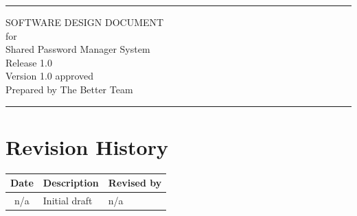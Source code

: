 \documentclass[letterpaper,12pt,oneside,listof=totoc]{scrreprt}
\date{\today}
\author{} %
\def\myversion{1.0 }
\begin{document}
\begin{titlepage}
\flushright
\rule{\textwidth}{5pt}\vskip1cm
\Huge{SOFTWARE DESIGN DOCUMENT}\\
\vspace{1.5cm}
for\\
\vspace{1.5cm}
Shared Password Manager System\\                      %
\vspace{1.5cm}
\LARGE{Release 1.0\\}
\vspace{1.5cm}
\LARGE{Version \myversion approved\\}
\vspace{1.5cm}
Prepared by The Better Team\\
\vfill
\rule{\textwidth}{5pt}
\end{titlepage}
\tableofcontents
\listoffigures
\listoftables

\chapter*{Revision History}

\begin{tabular}{| c | p{} | p{} |}
\hline
Date     & Description   & Revised by \\
\hline
n/a & Initial draft & n/a \\
\hline
\end{tabular}

%
%
%
\end{document}
